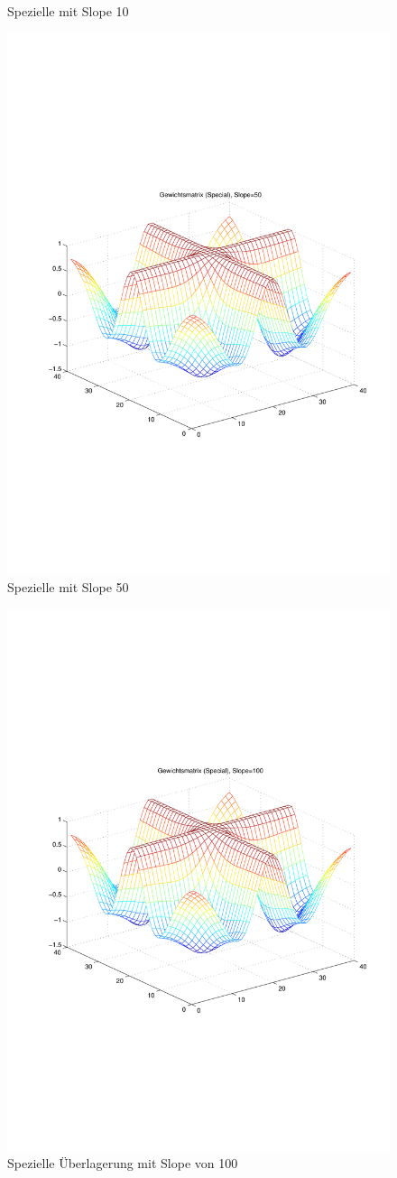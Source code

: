\begin{figure}[hbt]
\begin{minipage}{0.48\textwidth}
		\caption{Spezielle mit Slope 10}
		\label{Spez210}
	\end{minipage}
	\hfill
	\begin{minipage}{0.48\textwidth}
		\includegraphics[trim=70 200 32 242, clip, width=\textwidth]{./Bilder/Auswertung/Gewichtsmatrix/Gewichtsmatrix_Special_Slope_50}
		\caption{Spezielle mit Slope 50}
		\label{Spezl50}
	\end{minipage}
\end{figure}
\begin{figure}[hbt]
	\centering
	\includegraphics[trim=70 200 32 242, clip, width=0.48\linewidth]{./Bilder/Auswertung/Gewichtsmatrix/Gewichtsmatrix_Special_Slope_100}
	\caption{Spezielle Überlagerung mit Slope von 100}
	\label{Spez100}
\end{figure}
